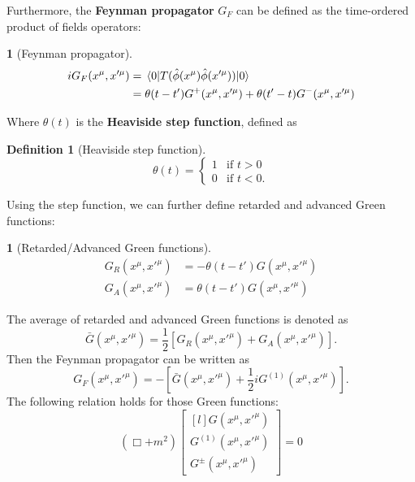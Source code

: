 \documentclass[12pt]{article}
\numberwithin{equation}{section}
\theoremstyle{1style}
\newtheorem{definition}[equation]{Definition}
\newtheorem{cthm}[equation]{}
\newcommand{\tbf}[1]{\textbf{#1}}
\begin{document}
Furthermore, the \tbf{Feynman propagator} \(G_{F}\) can be defined as the time-ordered product of fields operators:
\begin{cthm}[Feynman propagator]
  \begin{align*}
    iG_{F}(x^{\mu},x'^{\mu}) & =\expval{T(\hat{\phi}(x^{\mu})\hat{\phi}(x'^{\mu}))}{0}              \\
                             & =\theta(t-t')G^+(x^{\mu},x'^{\mu})+\theta(t'-t)G^-(x^{\mu},x'^{\mu})
  \end{align*}
\end{cthm}
Where \(\theta(t)\) is the \tbf{Heaviside step function}, defined as
\begin{definition}[Heaviside step function]
  \begin{equation*}
    \theta(t)=
    \begin{cases}
      1 & \text{if \(t>0\)}  \\
      0 & \text{if \(t<0\)}.
    \end{cases}
  \end{equation*}
\end{definition}
Using the step function, we can further define retarded and advanced Green functions:
\begin{cthm}[Retarded/Advanced Green functions]
  \begin{align*}
    G_{R}(x^{\mu},x'^{\mu}) & =-\theta(t-t')G(x^{\mu},x'^{\mu}) \\
    G_{A}(x^{\mu},x'^{\mu}) & =\theta(t-t')G(x^{\mu},x'^{\mu})
  \end{align*}
\end{cthm}
The average of retarded and advanced Green functions is denoted as
\begin{equation}
  \bar{G}(x^{\mu},x'^{\mu})=\frac{1}{2}\left[G_{R}(x^{\mu},x'^{\mu})+G_{A}(x^{\mu},x'^{\mu})\right].
\end{equation}
Then the Feynman propagator can be written as
\begin{equation}
  G_{F}(x^{\mu},x'^{\mu})=-\left[\bar{G}(x^{\mu},x'^{\mu})+\frac{1}{2}iG^{(1)}(x^{\mu},x'^{\mu})\right].
\end{equation}
The following relation holds for those Green functions:
\begin{equation}
  (\Box+m^2)
  \begin{bmatrix*}[l]
    G(x^{\mu},x'^{\mu})\\
    G^{(1)}(x^{\mu},x'^{\mu})\\
    G^{\pm}(x^{\mu},x'^{\mu})
  \end{bmatrix*}
  =0
\end{equation}
\end{document}
